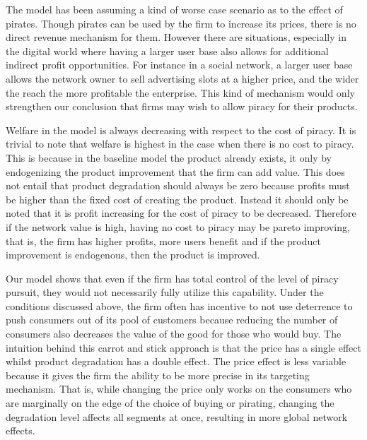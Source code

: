The model has been assuming a kind of worse case scenario as to the effect of pirates. Though pirates can be used by the firm to increase its prices, there is no direct revenue mechanism for them. However there are situations, especially in the digital world where having a larger user base also allows for additional indirect profit opportunities. For instance in a social network, a larger user base allows the network owner to sell advertising slots at a higher price, and the wider the reach the more profitable the enterprise. This kind of mechanism would only strengthen our conclusion that firms may wish to allow piracy for their products. 

Welfare in the model is always decreasing with respect to the cost of piracy. It is trivial to note that welfare is highest in the case when there is no cost to piracy. This is because in the baseline model the product already exists, it only by endogenizing the product improvement that the firm can add value. This does not entail that product degradation should always be zero because profits must be higher than the fixed cost of creating the product. Instead it should only be noted that it is profit increasing for the cost of piracy to be decreased. Therefore if the network value is high, having no cost to piracy may be pareto improving, that is, the firm has higher profits, more users benefit and if the product improvement is endogenous, then the product is improved. 



Our model shows that even if the firm has total control of the level of piracy pursuit, they would not necessarily fully utilize this capability. Under the conditions discussed above, the firm often has incentive to not use deterrence to push consumers out of its pool of customers because reducing the number of consumers also decreases the value of the good for those who would buy. The intuition behind this carrot and stick approach is that the price has a single effect whilst product degradation has a double effect. The price effect is less variable because it gives the firm the ability to be more precise in its targeting mechanism. That is, while changing the price only works on the consumers who are marginally on the edge of the choice of buying or pirating, changing the degradation level affects all segments at once, resulting in more global network effects. 

